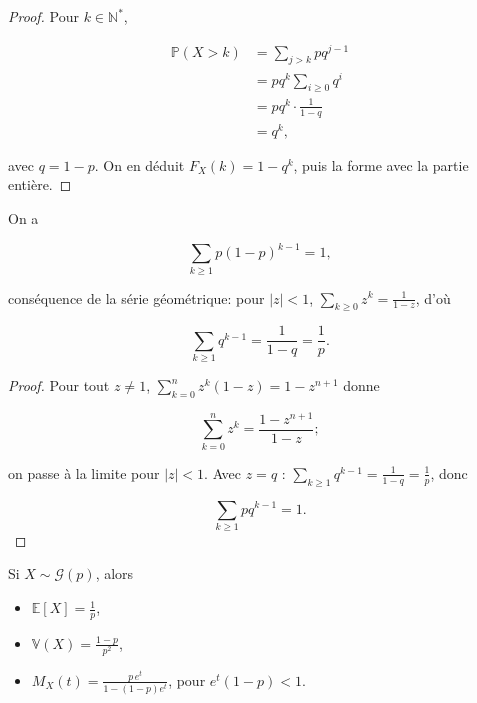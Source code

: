 \begin{proof}
Pour $k\in\mathbb{N}^*$,

\begin{align*}
\mathbb{P}(X>k) &=\sum_{j>k}p q^{j-1} \\
&=pq^{k}\sum_{i\ge0}q^i \\
&=pq^k\cdot\frac1{1-q} \\
&=q^k,
\end{align*}

avec $q=1-p$. On en déduit $F_X(k)=1-q^k$, puis la forme avec la partie entière.
\end{proof}

\begin{mdframed}
\begin{proposition}
On a

$$
\sum_{k\ge1}p(1-p)^{k-1}=1, 
$$

conséquence de la série géométrique: pour $|z|<1$, $\sum_{k\ge0}z^k=\frac1{1-z}$, d'où

$$
\sum_{k\ge1}q^{k-1}=\frac1{1-q}=\frac1p.
$$
\end{proposition}
\end{mdframed}

\begin{proof}
Pour tout $z\ne1$, $\sum_{k=0}^n z^k(1-z)=1-z^{n+1}$ donne

$$
\sum_{k=0}^n z^k=\frac{1-z^{n+1}}{1-z}; 
$$

on passe à la limite pour $|z|<1$. Avec $z=q$ : $\sum_{k\ge1}q^{k-1}=\frac1{1-q}=\frac1p$, donc

$$
\sum_{k\ge1}pq^{k-1}=1.
$$
\end{proof}

\begin{mdframed}
\begin{proposition}
Si $X\sim\mathcal{G}(p)$, alors

\begin{itemize}
\item $\mathbb{E}[X]=\frac1p$,
\item $\mathbb{V}(X)=\frac{1-p}{p^2}$,
\item $M_X(t)=\frac{p\,e^t}{1-(1-p)e^t}$, pour $e^t(1-p)<1$.
\end{itemize}
\end{proposition}
\end{mdframed}


